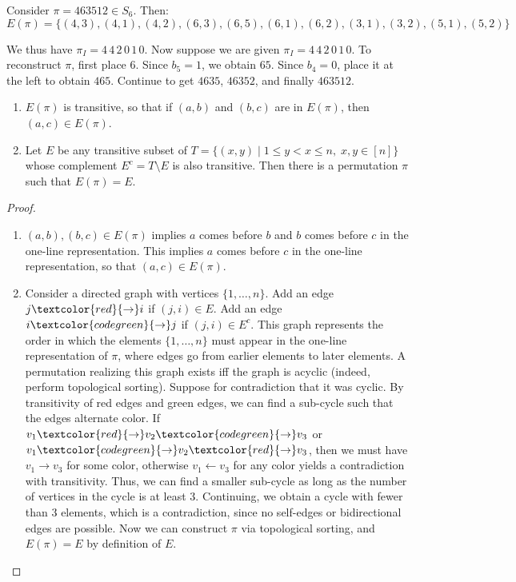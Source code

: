 \documentclass[a4paper]{article}
\begin{document}
\begin{example}
Consider $\pi=463512\in S_6$. Then:
\begin{equation*}
E(\pi)=\{(4,3),(4,1),(4,2),(6,3),(6,5),(6,1),(6,2),(3,1),(3,2),(5,1),(5,2)\}
\end{equation*}

We thus have $\pi_I=4\,4\,2\,0\,1\,0$. Now suppose we are given $\pi_I=4\,4\,2\,0\,1\,0$. To reconstruct $\pi$, first place $6$. Since $b_5=1$, we obtain $65$. Since $b_4=0$, place it at the left to obtain $465$. Continue to get $4635$, $46352$, and finally $463512$.
\end{example}

\begin{theorem}
\;
\begin{enumerate}
\item $E(\pi)$ is transitive, so that if $(a,b)$ and $(b,c)$ are in $E(\pi)$, then $(a,c)\in E(\pi)$.
\item Let $E$ be any transitive subset of $T=\{(x,y)\mid 1\leq y<x\leq n,\; x,y\in[n]\}$ whose complement $E^c=T\setminus E$ is also transitive. Then there is a permutation $\pi$ such that $E(\pi)=E$.
\end{enumerate}

\begin{hl}
\begin{proof}
\;
\begin{enumerate}
\item $(a,b),(b,c)\in E(\pi)$ implies $a$ comes before $b$ and $b$ comes before $c$ in the one-line representation. This implies $a$ comes before $c$ in the one-line representation, so that $(a,c)\in E(\pi)$.
\item
Consider a directed graph with vertices $\{1,\dots,n\}$. Add an edge $j\textcolor{red}{\rightarrow}i$ if $(j,i)\in E$. Add an edge $i\textcolor{codegreen}{\rightarrow}j$ if $(j,i)\in E^c$. This graph represents the order in which the elements $\{1,\dots,n\}$ must appear in the one-line representation of $\pi$, where edges go from earlier elements to later elements. A permutation realizing this graph exists iff the graph is acyclic (indeed, perform topological sorting). Suppose for contradiction that it was cyclic. By transitivity of red edges and green edges, we can find a sub-cycle such that the edges alternate color. If $v_1\textcolor{red}{\rightarrow}v_2\textcolor{codegreen}{\rightarrow}v_3$ or $v_1\textcolor{codegreen}{\rightarrow}v_2\textcolor{red}{\rightarrow}v_3$, then we must have $v_1\rightarrow v_3$ for some color, otherwise $v_1\leftarrow v_3$ for any color yields a contradiction with transitivity. Thus, we can find a smaller sub-cycle as long as the number of vertices in the cycle is at least 3. Continuing, we obtain a cycle with fewer than 3 elements, which is a contradiction, since no self-edges or bidirectional edges are possible. Now we can construct $\pi$ via topological sorting, and $E(\pi)=E$ by definition of $E$.\qedhere
\end{enumerate}
\end{proof}
\end{hl}
\end{theorem}
\end{document}
